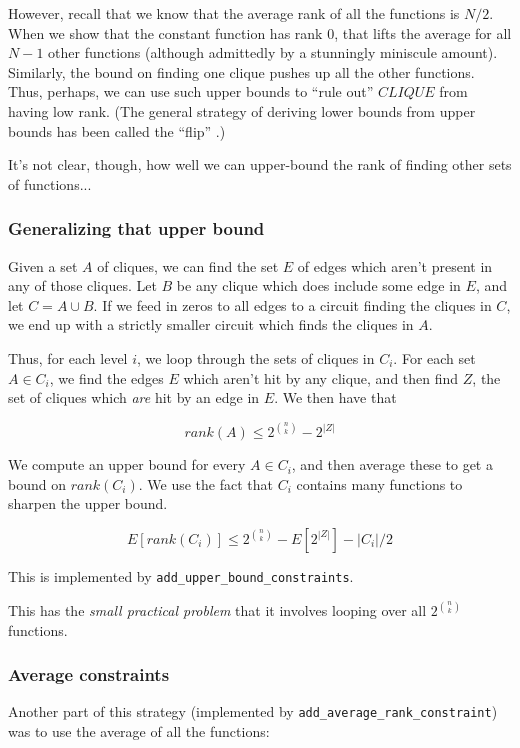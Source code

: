 \documentclass[12pt]{article}
\theoremstyle{definition}
\begin{document}
However, recall that we know that the average rank of all the functions
is $N/2$.
When we show that the constant function has rank 0, that lifts
the average for all $N-1$ other functions (although admittedly
by a stunningly miniscule amount).
Similarly, the bound on finding one clique pushes up all the other functions.
Thus, perhaps, we can use such upper bounds to ``rule out'' $CLIQUE$ from
having low rank. (The general strategy of deriving lower bounds from
upper bounds has been called the ``flip'' \cite{aaronson_pnp}.)

It's not clear, though, how well we can upper-bound the rank
of finding other sets of functions...

\subsubsection{Generalizing that upper bound}

Given a set $A$ of cliques, we
can find the set $E$ of edges which aren't present in any of those cliques.
Let $B$ be any clique which does include some edge in $E$, and let
$C = A \cup B$. If we feed in zeros to all edges to a circuit
finding the cliques in $C$, we end up with a strictly smaller circuit 
which finds the cliques in $A$.

Thus, for each level $i$, we loop through the sets of cliques in $C_i$.
For each set $A \in C_i$, we find the edges $E$ which aren't hit by any clique, and then
find $Z$, the set of cliques which {\em are} hit by an edge in $E$.
We then have that 

\[
rank(A) \le 2^{n \choose k} - 2^{|Z|}
\]

We compute an upper bound for every $A \in C_i$, and then average these
to get a bound on $rank(C_i)$. We use the fact that $C_i$ contains many
functions to sharpen the upper bound.

\[
E[rank(C_i)] \le 2^{n \choose k} - E[2^{|Z|}] - |C_i|/2
\]

This is implemented by {\tt add\_upper\_bound\_constraints}.

This has the {\em small practical problem} that it involves
looping over all $2^{n \choose k}$ functions.

\subsubsection{Average constraints}

Another part of this strategy 
(implemented by {\tt add\_average\_rank\_constraint}) was
to use the average of all the functions:
\end{document}
